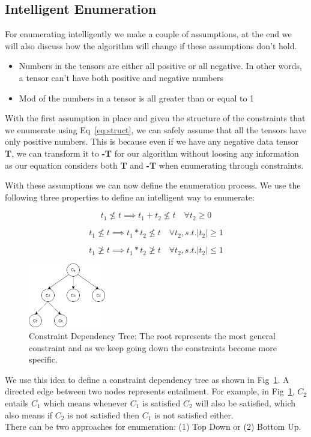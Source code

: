 \documentclass{article}
\begin{document}
\subsection{Intelligent Enumeration}
For enumerating intelligently we make a couple of assumptions, at the end we will also discuss how the algorithm will change if these assumptions don't hold.
\begin{itemize}
\item Numbers in the tensors are either all positive or all negative. In other words, a tensor can't have both positive and negative numbers
\item Mod of the numbers in a tensor is all greater than or equal to 1
\end{itemize}
With the first assumption in place and given the structure of the constraints that we enumerate using Eq~\ref{eq:struct}, we can safely assume that all the tensors have only positive numbers. This is because even if we have any negative data tensor \textbf{T}, we can transform it to \textbf{-T} for our algorithm without loosing any information as our equation considers both \textbf{T} and \textbf{-T} when enumerating through constraints.

With these assumptions we can now define the enumeration process. We use the following three properties to define an intelligent way to enumerate:

\begin{equation}
t_1 \not\le t \implies t_1 + t_2 \not\le t \quad \forall t_2 \geq 0
\end{equation} 

\begin{equation}
t_1 \not\le t \implies t_1 * t_2 \not\le t \quad \forall t_2, s.t. |t_2| \geq 1
\end{equation} 

\begin{equation}
t_1 \not\ge t \implies t_1 * t_2 \not\ge t \quad \forall t_2, s.t. |t_2| \le 1
\end{equation} 
\begin{figure}[tb]
    \centering
\includegraphics[width=0.3\textwidth]{images/constraintTree.png}
    \caption{\label{fig:constraintTree} Constraint Dependency Tree: The root represents the most general constraint and as we keep going down the constraints become more specific.}
\end{figure}
We use this idea to define a constraint dependency tree as shown in Fig~\ref{fig:constraintTree}. A directed edge between two nodes represents entailment. For example, in Fig~\ref{fig:constraintTree}, $C_2$ entails $C_1$ which means whenever $C_1$ is satisfied $C_2$ will also be satisfied, which also means if $C_2$ is not satisfied then $C_1$ is not satisfied either.
\\
There can be two approaches for enumeration: (1) Top Down or (2) Bottom Up.
 
\end{document}
